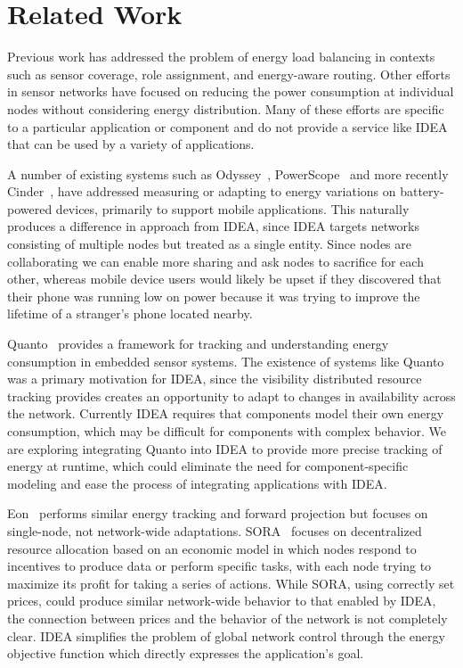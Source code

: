 \documentclass{sig-alternate}
\begin{document}
\section{Related Work}
\label{sec-related}

Previous work has addressed the problem of energy load balancing in contexts
such as sensor coverage, role assignment, and energy-aware routing. Other
efforts in sensor networks have focused on reducing the power consumption at
individual nodes without considering energy distribution. Many of these
efforts are specific to a particular application or component and do not
provide a service like IDEA that can be used by a variety of applications. 

A number of existing systems such as Odyssey~\cite{odyssey-osr99},
PowerScope~\cite{powerscope-wmcsa99} and more recently
Cinder~\cite{cinder-mobiheld09}, have addressed measuring or adapting to
energy variations on battery-powered devices, primarily to support mobile
applications. This naturally produces a difference in approach from IDEA,
since IDEA targets networks consisting of multiple nodes but treated as a
single entity. Since nodes are collaborating we can enable more sharing and
ask nodes to sacrifice for each other, whereas mobile device users would
likely be upset if they discovered that their phone was running low on power
because it was trying to improve the lifetime of a stranger's phone located
nearby.

Quanto~\cite{quanto-osdi08} provides a framework for tracking and
understanding energy consumption in embedded sensor systems. The existence of
systems like Quanto was a primary motivation for IDEA, since the visibility
distributed resource tracking provides creates an opportunity to adapt to
changes in availability across the network. Currently IDEA requires that
components model their own energy consumption, which may be difficult for
components with complex behavior. We are exploring integrating Quanto into
IDEA to provide more precise tracking of energy at runtime, which could
eliminate the need for component-specific modeling and ease the process of
integrating applications with IDEA.

Eon~\cite{eon-sensys07} performs similar energy tracking and forward
projection but focuses on single-node, not network-wide adaptations.
SORA~\cite{sora-nsdi05} focuses on decentralized resource allocation based on
an economic model in which nodes respond to incentives to produce data or
perform specific tasks, with each node trying to maximize its profit for
taking a series of actions. While SORA, using correctly set prices, could
produce similar network-wide behavior to that enabled by IDEA, the connection
between prices and the behavior of the network is not completely clear. IDEA
simplifies the problem of global network control through the energy objective
function which directly expresses the application's goal.
\end{document}
